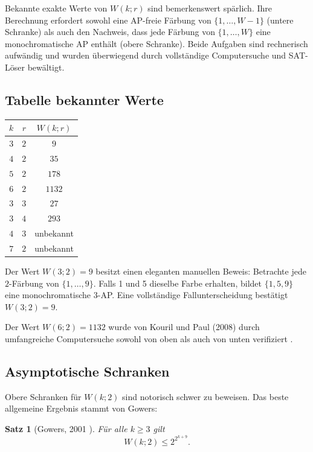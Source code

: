 \documentclass[12pt,a4paper]{amsart}
\newtheorem{theorem}{Satz}[section]
\theoremstyle{definition}
\begin{document}
Bekannte exakte Werte von $W(k;r)$ sind bemerkenswert spärlich. Ihre Berechnung
erfordert sowohl eine AP-freie Färbung von $\{1, \ldots, W-1\}$ (untere
Schranke) als auch den Nachweis, dass jede Färbung von $\{1, \ldots, W\}$ eine
monochromatische AP enthält (obere Schranke). Beide Aufgaben sind rechnerisch
aufwändig und wurden überwiegend durch vollständige Computersuche und
SAT-Löser bewältigt.

\subsection{Tabelle bekannter Werte}

\begin{center}
\begin{tabular}{ccc}
\toprule
$k$ & $r$ & $W(k; r)$ \\
\midrule
$3$ & $2$ & $9$ \\
$4$ & $2$ & $35$ \\
$5$ & $2$ & $178$ \\
$6$ & $2$ & $1132$ \\
$3$ & $3$ & $27$ \\
$3$ & $4$ & $293$ \\
$4$ & $3$ & unbekannt \\
$7$ & $2$ & unbekannt \\
\bottomrule
\end{tabular}
\end{center}

Der Wert $W(3;2)=9$ besitzt einen eleganten manuellen Beweis: Betrachte jede
$2$-Färbung von $\{1,\ldots,9\}$. Falls 1 und 5 dieselbe Farbe erhalten, bildet
$\{1,5,9\}$ eine monochromatische $3$-AP. Eine vollständige Fallunterscheidung
bestätigt $W(3;2) = 9$.

Der Wert $W(6;2) = 1132$ wurde von Kouril und Paul (2008) durch umfangreiche
Computersuche sowohl von oben als auch von unten verifiziert \cite{Kouril2008}.

\subsection{Asymptotische Schranken}

Obere Schranken für $W(k;2)$ sind notorisch schwer zu beweisen. Das beste
allgemeine Ergebnis stammt von Gowers:

\begin{theorem}[Gowers, 2001 \cite{Gowers2001}]
Für alle $k \geq 3$ gilt
\[
  W(k; 2) \leq 2^{2^{k+9}}.
\]
\end{theorem}
\end{document}
